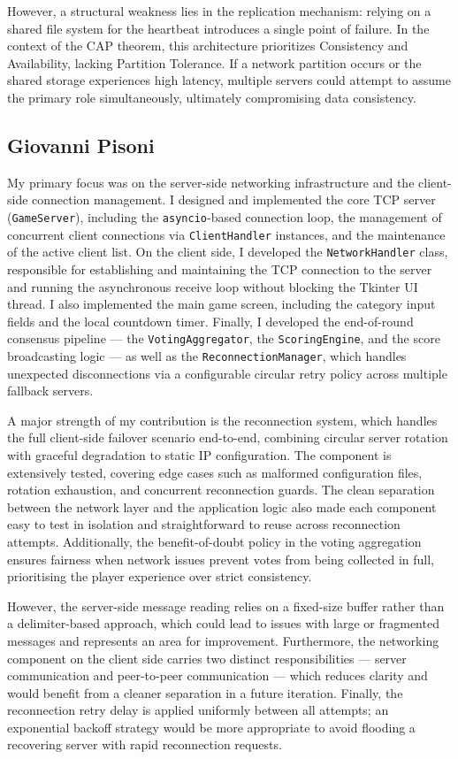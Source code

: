 \documentclass{scrartcl}
\begin{document}
However, a structural weakness lies in the replication mechanism: relying on a shared file system for the heartbeat introduces a single point of failure. 
In the context of the CAP theorem, this architecture prioritizes Consistency and Availability, lacking Partition Tolerance. 
If a network partition occurs or the shared storage experiences high latency, multiple servers could attempt to assume the primary role simultaneously,
ultimately compromising data consistency.

\subsection{Giovanni Pisoni}
My primary focus was on the server-side networking infrastructure and the client-side connection management.
I designed and implemented the core TCP server (\texttt{GameServer}), including the \texttt{asyncio}-based connection loop,
the management of concurrent client connections via \texttt{ClientHandler} instances, and the maintenance of the active client list.
On the client side, I developed the \texttt{NetworkHandler} class, responsible for establishing and maintaining the TCP connection to the server
and running the asynchronous receive loop without blocking the Tkinter UI thread.
I also implemented the main game screen, including the category input fields and the local countdown timer.
Finally, I developed the end-of-round consensus pipeline --- the \texttt{VotingAggregator}, the \texttt{ScoringEngine}, and the score broadcasting logic ---
as well as the \texttt{ReconnectionManager}, which handles unexpected disconnections via a configurable circular retry policy across multiple fallback servers.

A major strength of my contribution is the reconnection system, which handles the full client-side failover scenario end-to-end,
combining circular server rotation with graceful degradation to static IP configuration.
The component is extensively tested, covering edge cases such as malformed configuration files, rotation exhaustion, and concurrent reconnection guards.
The clean separation between the network layer and the application logic also made each component easy to test in isolation
and straightforward to reuse across reconnection attempts.
Additionally, the benefit-of-doubt policy in the voting aggregation ensures fairness when network issues prevent votes from being collected in full,
prioritising the player experience over strict consistency.

However, the server-side message reading relies on a fixed-size buffer rather than a delimiter-based approach,
which could lead to issues with large or fragmented messages and represents an area for improvement.
Furthermore, the networking component on the client side carries two distinct responsibilities --- server communication and peer-to-peer communication ---
which reduces clarity and would benefit from a cleaner separation in a future iteration.
Finally, the reconnection retry delay is applied uniformly between all attempts; an exponential backoff strategy would be more appropriate
to avoid flooding a recovering server with rapid reconnection requests.
\end{document}
